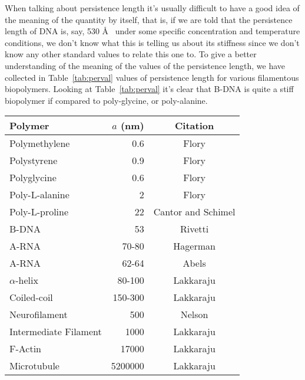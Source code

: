 When talking about persistence length it's usually difficult to have a
good idea of the meaning of the quantity by itself, that is, if we are
told that the  persistence length of DNA is, say,  530 \AA~ under some
specific concentration and temperature  conditions, we don't know what
this is telling  us about its stiffness since we  don't know any other
standard values to relate this  one to. To give a better understanding
of  the meaning  of  the values  of  the persistence  length, we  have
collected in  Table~\ref{tab:perval} values of  persistence length for
various  filamentous biopolymers.   Looking  at Table~\ref{tab:perval}
it's  clear that  B-DNA is  quite a  stiff biopolymer  if  compared to
poly-glycine, or poly-alanine.

\begin{table}[htbp]
\begin{center}
\begin{threeparttable}
\begin{tabular}{l|r|c}
\hline
Polymer               & $a$ (nm) & Citation  \\ \hline
Polymethylene         & 0.6      & Flory\tnote{a}      \\  
Polystyrene           & 0.9      & Flory\tnote{a}      \\
Polyglycine           & 0.6      & Flory \tnote{b}     \\
Poly-L-alanine        & 2        & Flory \tnote{b}     \\
Poly-L-proline        & 22       & Cantor and Schimel \cite{cantor1980} \\
B-DNA                 & 53       & Rivetti \cite{rivetti1996}     \\
A-RNA                 & 70-80    & Hagerman  \cite{hagerman1997}  \\
A-RNA                 & 62-64    & Abels     \cite{abels2005}     \\
$\alpha$-helix        & 80-100   & Lakkaraju \cite{lakkaraju2009} \\
Coiled-coil           & 150-300  & Lakkaraju \cite{lakkaraju2009} \\
Neurofilament         & 500      & Nelson    \cite{nelson2004}    \\
Intermediate Filament & 1000     & Lakkaraju \cite{lakkaraju2009} \\
F-Actin               & 17000    & Lakkaraju \cite{lakkaraju2009} \\
Microtubule           & 5200000  & Lakkaraju \cite{lakkaraju2009} \\

\end{tabular}
\end{threeparttable}
\end{center}
\end{table}

